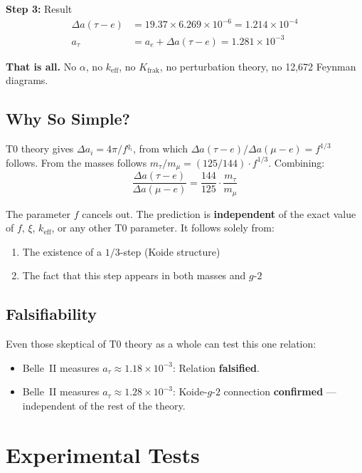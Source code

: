 	\textbf{Step 3:} Result
	\begin{align}
		\Delta a(\tau{-}e) &= 19.37 \times 6.269 \times 10^{-6} = 1.214 \times 10^{-4} \\
		a_\tau &= a_e + \Delta a(\tau{-}e) = \boxed{1.281 \times 10^{-3}}
	\end{align}
	
	\textbf{That is all.} No $\alpha$, no $k_\text{eff}$, no $K_\text{frak}$, no perturbation theory, no 12,672 Feynman diagrams.
	
	\subsection{Why So Simple?}
	
	T0 theory gives $\Delta a_i = 4\pi/f^{q_i}$, from which $\Delta a(\tau{-}e)/\Delta a(\mu{-}e) = f^{1/3}$ follows. From the masses follows $m_\tau/m_\mu = (125/144) \cdot f^{1/3}$. Combining:
	\begin{equation}
		\frac{\Delta a(\tau{-}e)}{\Delta a(\mu{-}e)} = \frac{144}{125} \cdot \frac{m_\tau}{m_\mu}
	\end{equation}
	
	The parameter $f$ cancels out. The prediction is \textbf{independent} of the exact value of $f$, $\xi$, $k_\text{eff}$, or any other T0 parameter. It follows solely from:
	\begin{enumerate}
		\item The existence of a $1/3$-step (Koide structure)
		\item The fact that this step appears in both masses and $g$-$2$
	\end{enumerate}
	
	\subsection{Falsifiability}
	
	Even those skeptical of T0 theory as a whole can test this one relation:
	\begin{itemize}
		\item Belle~II measures $a_\tau \approx 1.18 \times 10^{-3}$: Relation \textbf{falsified}.
		\item Belle~II measures $a_\tau \approx 1.28 \times 10^{-3}$: Koide-$g$-$2$ connection \textbf{confirmed} --- independent of the rest of the theory.
	\end{itemize}
	
	\section{Experimental Tests}
	
